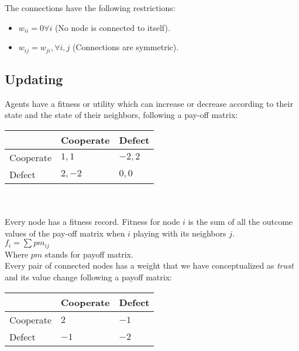\documentclass[11pt]{article}
\begin{document}
The connections have the following restrictions:

\begin{itemize}

\item $w_{ii} = 0 \forall i$  (No node is connected to itself).

\item $w_{ij} = w_{ji}, \forall i,j$  (Connections are symmetric).

\end{itemize}


\subsection{Updating}

Agents have a fitness or utility which can increase or decrease according to their state and the state of their neighbors, following a pay-off matrix:\\


\begin{tabular}{| l | l | l |}
\hline
          & Cooperate & Defect \\ \hline
Cooperate & $1, 1$ & $-2, 2$   \\ \hline
Defect    & $2, -2$& $0,0$   \\ \hline

\end{tabular}\\ \\

Every node has a fitness record. Fitness for node $i$ is the sum of all the outcome values of the pay-off matrix when $i$ playing with its neighbors $j$.\\

$f_{i} = \sum pm_{ij}$\\

Where $pm$ stands for payoff matrix.\\

Every pair of connected nodes has a weight that we have conceptualized as \textit{trust} and its value change following a payoff matrix:\\

\begin{tabular}{| l | l | l |}
\hline
          & Cooperate & Defect \\ \hline
Cooperate & $2$ & $-1$   \\ \hline
Defect    & $-1$& $-2$   \\ \hline

\end{tabular}\\ \\
\end{document}
